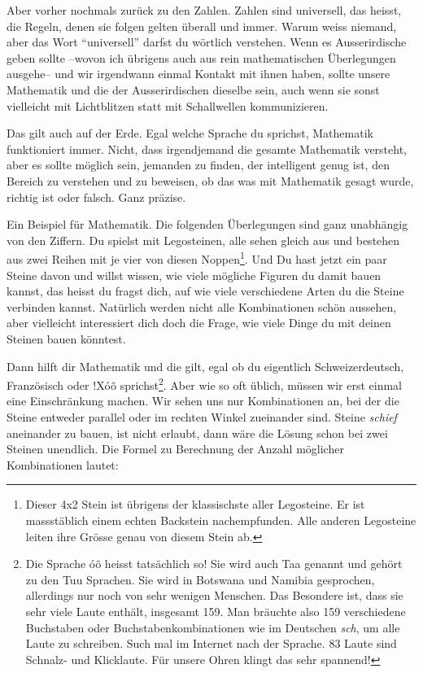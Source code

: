 Aber vorher nochmals zurück zu den Zahlen. Zahlen sind universell, das heisst, die Regeln, denen sie folgen gelten überall und immer. Warum weiss niemand, aber das Wort \enquote{universell} darfst du wörtlich verstehen. Wenn es Ausserirdische geben sollte --wovon ich übrigens auch aus rein mathematischen Überlegungen ausgehe-- und wir irgendwann einmal Kontakt mit ihnen haben, sollte unsere Mathematik und die der Ausserirdischen dieselbe sein, auch wenn sie sonst vielleicht mit Lichtblitzen statt mit Schallwellen kommunizieren.

Das gilt auch auf der Erde. Egal welche Sprache du sprichst, Mathematik funktioniert immer. Nicht, dass irgendjemand die gesamte Mathematik versteht, aber es sollte möglich sein, jemanden zu finden, der intelligent genug ist, den Bereich zu verstehen und zu beweisen, ob das was mit Mathematik gesagt wurde, richtig ist oder falsch. Ganz präzise.

Ein Beispiel für Mathematik. Die folgenden Überlegungen sind ganz unabhängig von den Ziffern. Du spielst mit Legosteinen, alle sehen gleich aus und bestehen aus zwei Reihen mit je vier von diesen Noppen\footnote{Dieser 4x2 Stein ist übrigens der klassischste aller Legosteine. Er ist massstäblich einem echten Backstein nachempfunden. Alle anderen Legosteine leiten ihre Grösse genau von diesem Stein ab.}. Und Du hast jetzt ein paar Steine davon und willst wissen, wie viele mögliche Figuren du damit bauen kannst, das heisst du fragst dich, auf wie viele verschiedene Arten du die Steine verbinden kannst. Natürlich werden nicht alle Kombinationen schön aussehen, aber vielleicht interessiert dich doch die Frage, wie viele Dinge du mit deinen Steinen bauen könntest.

Dann hilft dir Mathematik und die gilt, egal ob du eigentlich Schweizerdeutsch, Französisch oder $!$X\'{o}\~{o} sprichst\footnote{Die Sprache \'{o}\~{o} heisst tatsächlich so! Sie wird auch Taa genannt und gehört zu den Tuu Sprachen. Sie wird in Botswana und Namibia gesprochen, allerdings nur noch von sehr wenigen Menschen. Das Besondere ist, dass sie sehr viele Laute enthält, insgesamt 159. Man bräuchte also 159 verschiedene Buchstaben oder Buchstabenkombinationen wie im Deutschen \textit{sch}, um alle Laute zu schreiben. Such mal im Internet nach der Sprache. 83 Laute sind Schnalz- und Klicklaute. Für unsere Ohren klingt das sehr spannend!}. Aber wie so oft üblich, müssen wir erst einmal eine Einschränkung machen. Wir sehen uns nur Kombinationen an, bei der die Steine entweder parallel oder im rechten Winkel zueinander sind. Steine \textit{schief} aneinander zu bauen, ist nicht erlaubt, dann wäre die Lösung schon bei zwei Steinen unendlich. Die Formel zu Berechnung der Anzahl möglicher Kombinationen lautet:

